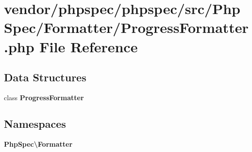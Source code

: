 \section{vendor/phpspec/phpspec/src/\+Php\+Spec/\+Formatter/\+Progress\+Formatter.php File Reference}
\label{_progress_formatter_8php}
\subsection*{Data Structures}
\begin{DoxyCompactItemize}
\item 
class {\bf Progress\+Formatter}
\end{DoxyCompactItemize}
\subsection*{Namespaces}
\begin{DoxyCompactItemize}
\item 
 {\bf Php\+Spec\textbackslash{}\+Formatter}
\end{DoxyCompactItemize}
